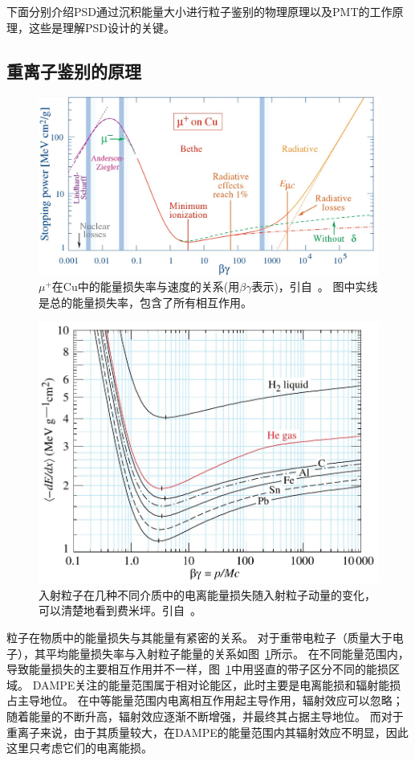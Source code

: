 下面分别介绍PSD通过沉积能量大小进行粒子鉴别的物理原理以及PMT的工作原理，这些是理解PSD设计的关键。

\subsection{重离子鉴别的原理}
\begin{figure}[h!]
	\centering
	\includegraphics[width=0.8\linewidth]{chap/description/fig/energyloss_vs_velocity}
	\caption{${\mu}^+$在Cu中的能量损失率与速度的关系(用$\beta\gamma$表示)，引自~\parencite{pdg_book}。 图中实线是总的能量损失率，包含了所有相互作用。}
	\label{fig:ch2:energyloss_vs_velocity}
\end{figure}

\begin{figure}[h!]
	\centering
	\includegraphics[width=0.8\linewidth]{chap/description/fig/fermi_plateau}
	\caption{入射粒子在几种不同介质中的电离能量损失随入射粒子动量的变化，可以清楚地看到费米坪。引自~\parencite{pdg_book}。}
	\label{fig:ch2:fermi_plateau}
\end{figure}

粒子在物质中的能量损失与其能量有紧密的关系。
对于重带电粒子（质量大于电子），其平均能量损失率与入射粒子能量的关系如图~\ref{fig:ch2:energyloss_vs_velocity}所示。
在不同能量范围内，导致能量损失的主要相互作用并不一样，图~\ref{fig:ch2:energyloss_vs_velocity}中用竖直的带子区分不同的能损区域。
DAMPE关注的能量范围属于相对论能区，此时主要是电离能损和辐射能损占主导地位。
在中等能量范围内电离相互作用起主导作用，辐射效应可以忽略；随着能量的不断升高，辐射效应逐渐不断增强，并最终其占据主导地位。
而对于重离子来说，由于其质量较大，在DAMPE的能量范围内其辐射效应不明显，因此这里只考虑它们的电离能损。

